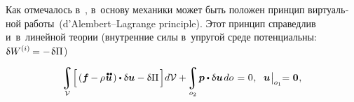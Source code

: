 \begin{otherlanguage}{russian}
Как отмечалось в~, в~основу механики может быть положен принцип виртуальной работы~(\hbox{d’\hspace{-0.2ex}Alembert--Lagrange} principle).
Этот принцип справедлив и~в~линейной теории (внутренние силы в~упругой среде потенциальны: ${\variation{\internalwork} = - \hspace{.2ex} \variation{\Pi}}$)

\nopagebreak\vspace{-0.2em}\begin{equation}\label{lineartheory:principleofvirtualwork}
\integral\displaylimits_{\mathcal{V}} \hspace{-0.4ex} \left[^{\mathstrut} \hspace{-0.2ex} \left( \bm{f} \hspace{-0.1ex} - \hspace{-0.1ex} \rho \hspace{.1ex} \mathdotdotabove{\bm{u}} \hspace{.2ex} \right) \dotp \variation{\bm{u}} - \variation{\Pi} \hspace{.25ex} \right] \hspace{-0.32ex} d\mathcal{V} + \hspace{-0.2ex}
\integral\displaylimits_{o_2} \hspace{-0.25ex} \bm{p} \dotp \variation{\bm{u}} \hspace{.25ex} do \hspace{.2ex}
= \hspace{.1ex} 0
\hspace{.1ex} ,
\hspace{.6em}
%
\bm{u} \hspace{.1ex} \bigr|_{o_1} \hspace{-0.64ex} = \hspace{.1ex} \bm{0}
\hspace{.1ex},
\end{equation}


\end{otherlanguage}
